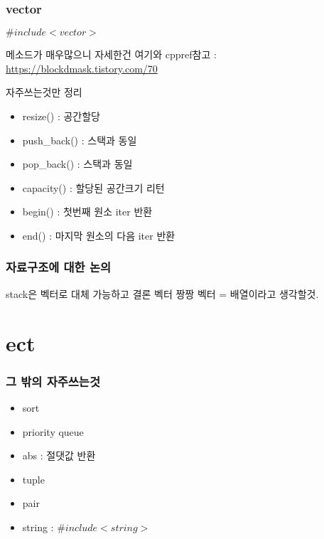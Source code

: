 \documentclass[10pt]{beamer}
\begin{document}
\begin{frame}    
    \frametitle{vector}
    $\#include<vector>$

    메소드가 매우많으니 자세한건 여기와 cppref참고 : \url{https://blockdmask.tistory.com/70}
    
    자주쓰는것만 정리
    
    \begin{itemize}
        \item resize() : 공간할당
        \item push\_back() : 스택과 동일 
        \item pop\_back() : 스택과 동일
        \item capacity() : 할당된 공간크기 리턴 
        \item begin() : 첫번째 원소 iter 반환
        \item end() : 마지막 원소의 다음 iter 반환
    \end{itemize}

\end{frame}


\begin{frame}
    \frametitle{자료구조에 대한 논의}
\end{frame}


\begin{frame}
    stack은 벡터로 대체 가능하고 결론 벡터 짱짱
    벡터 = 배열이라고 생각할것.
    
\end{frame}




 \section{ect}

\begin{frame}[fragile] 
    \frametitle{그 밖의 자주쓰는것}
    
    \begin{itemize}
        \item sort
        \item priority queue
        \item abs : 절댓값 반환
        \item tuple
        \item pair
        \item string : $\#include <string>$
    \end{itemize}
    
\end{frame}
\end{document}
